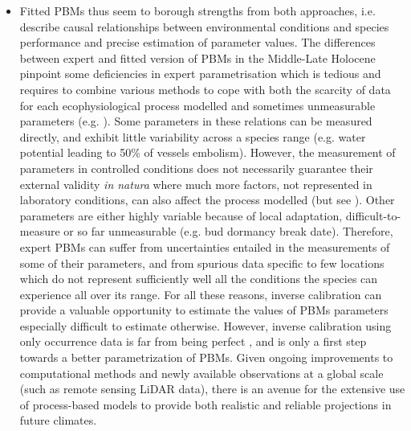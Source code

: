 \documentclass[pdflatex, sn-nature]{sn-jnl}%
\begin{document}
\begin{itemize}
\item Fitted PBMs thus seem to borough strengths from both approaches, i.e. describe causal relationships between environmental conditions and species performance and precise estimation of parameter values. The differences between expert and fitted version of PBMs in the Middle-Late Holocene pinpoint some deficiencies in expert parametrisation which is tedious and requires to combine various methods to cope with both the scarcity of data for each ecophysiological process modelled and sometimes unmeasurable parameters (e.g. \citep{DeCaceres2023}).  Some parameters in these relations can be measured directly, and exhibit little variability across a species range (e.g. water potential leading to 50\% of vessels embolism). However, the measurement of parameters in controlled conditions does not necessarily guarantee their external validity \emph{in natura} \cite{Asse2020} where much more factors, not represented in laboratory conditions, can also affect the process modelled (but see \cite{Satake2013}). Other parameters are either highly variable because of local adaptation,  difficult-to-measure or so far unmeasurable (e.g. bud dormancy break date). Therefore, expert PBMs can suffer from uncertainties entailed in the measurements of some of their parameters, and from spurious data specific to few locations which do not represent sufficiently well all the conditions the species can experience all over its range. For all these reasons, inverse calibration can provide a valuable opportunity to estimate the values of PBMs parameters especially difficult to estimate otherwise. However, inverse calibration using only occurrence data is far from being perfect \cite{VanderMeersch2023}, and is only a first step towards a better parametrization of PBMs. Given ongoing improvements to computational methods and newly available observations at a global scale (such as remote sensing LiDAR data), there is an avenue for the extensive use of process-based models to provide both realistic and reliable projections in future climates.


\end{itemize}
\end{document}
